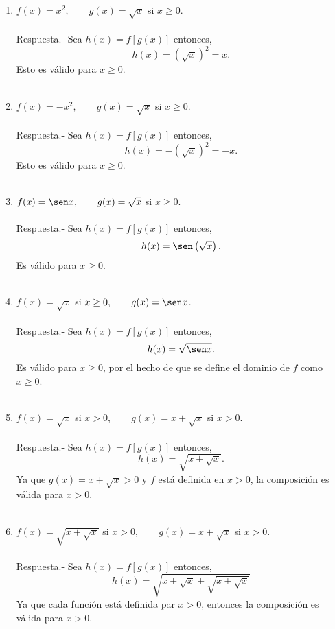 \begin{enumerate}[\bfseries 1.]
    \item $f(x)=x^2,\qquad g(x)=\sqrt{x}$ si $x\geq 0.$\\\\
	Respuesta.- Sea $h(x)=f[g(x)]$ entonces,
	$$h(x)=\left(\sqrt{x}\right)^2=x.$$
	Esto es válido para $x\geq 0$.\\\\

    \item $f(x)=-x^2,\qquad g(x)=\sqrt{x}$ si $x\geq 0.$\\\\
	Respuesta.- Sea $h(x)=f[g(x)]$ entonces,
	$$h(x)=-\left(\sqrt{x}\right)^2=-x.$$
	Esto es válido para $x\geq 0$.\\\\

    \item $f(x)=\sen x,\qquad g(x)=\sqrt{x}$ si $x\geq 0.$\\\\
	Respuesta.- Sea $h(x)=f[g(x)]$ entonces,
	$$h(x)=\sen \left(\sqrt{x}\right).$$
	Es válido para $x\geq 0$.\\\\

    \item $f(x)=\sqrt{x}$ si $x\geq 0,\qquad g(x)=\sen x$.\\\\
	Respuesta.- Sea $h(x)=f[g(x)]$ entonces,
	$$h(x)=\sqrt{\sen x}.$$
	Es válido para $x\geq 0$, por el hecho de que se define el dominio de $f$ como $x\geq 0$.\\\\

    \item $f(x)=\sqrt{x}$ si $x>0,\qquad g(x)=x+\sqrt{x}$ si $x>0$.\\\\
	Respuesta.- Sea $h(x)=f[g(x)]$ entonces,
	$$h(x)=\sqrt{x+\sqrt{x}}.$$
	Ya que $g(x)=x+\sqrt{x}>0$ y $f$ está definida en $x>0$, la composición es válida para $x>0$.\\\\

    \item $f(x)=\sqrt{x+\sqrt{x}}$ si $x>0, \qquad g(x)=x+\sqrt{x}$ si $x>0$.\\\\
	Respuesta.- Sea $h(x)=f[g(x)]$ entonces,
	$$h(x)=\sqrt{x+\sqrt{x}+\sqrt{x+\sqrt{x}}}$$
	Ya que cada función está definida par $x>0$, entonces la composición es válida para $x>0$.\\\\


\end{enumerate}
